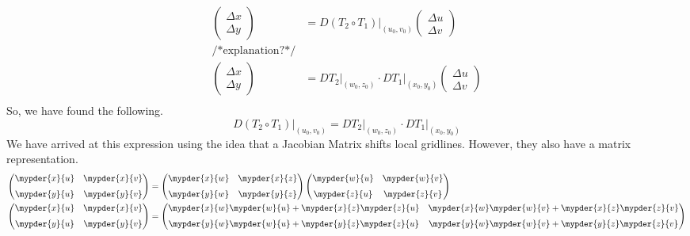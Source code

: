 \documentclass[11pt]{article}
\begin{document}
\begin{align*}
    \begin{pmatrix} \Delta x \\ \Delta y \end{pmatrix}
    &= D(T_2 \circ T_1)\rvert_{(u_0,v_0)}
    \begin{pmatrix} \Delta u \\ \Delta v \end{pmatrix} \\
\text{/*explanation?*/}\\
    \begin{pmatrix} \Delta x \\ \Delta y \end{pmatrix}
    &= DT_2\rvert_{(w_0,z_0)}\cdot DT_1\rvert_{(x_0,y_0)}
    \begin{pmatrix} \Delta u \\ \Delta v \end{pmatrix} \\
\end{align*}
So, we have found the following.
\begin{equation}
    D(T_2 \circ T_1)\rvert_{(u_0,v_0)}
    = DT_2\rvert_{(w_0,z_0)}\cdot DT_1\rvert_{(x_0,y_0)}
\end{equation}
We have arrived at this expression using the idea that a Jacobian Matrix shifts local gridlines. However, they also have a matrix representation.
\begin{align*}
    \begin{pmatrix}
        \mypder{x}{u} & \mypder{x}{v} \\[6pt]
        \mypder{y}{u} & \mypder{y}{v}
    \end{pmatrix}
    &= \begin{pmatrix}
        \mypder{x}{w} & \mypder{x}{z} \\[6pt]
        \mypder{y}{w} & \mypder{y}{z}
    \end{pmatrix}
    \begin{pmatrix}
        \mypder{w}{u} & \mypder{w}{v} \\[6pt]
        \mypder{z}{u} & \mypder{z}{v}
    \end{pmatrix} \\
    \begin{pmatrix}
        \mypder{x}{u} & \mypder{x}{v} \\[6pt]
        \mypder{y}{u} & \mypder{y}{v}
    \end{pmatrix}
    &= \begin{pmatrix}
    \mypder{x}{w}\mypder{w}{u}+ 
    \mypder{x}{z}\mypder{z}{u}&
    \mypder{x}{w}\mypder{w}{v}+ 
    \mypder{x}{z}\mypder{z}{v}\\[6pt]
    \mypder{y}{w}\mypder{w}{u}+ 
    \mypder{y}{z}\mypder{z}{u}&
    \mypder{y}{w}\mypder{w}{v}+ 
    \mypder{y}{z}\mypder{z}{v}
    \end{pmatrix}
\end{align*}
\end{document}
